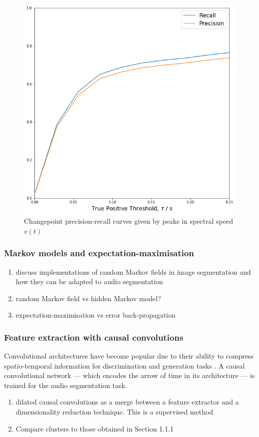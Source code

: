 \documentclass{article}[12pt]
\numberwithin{equation}{section}
\begin{document}
\begin{figure}[H]
\centering{}
\captionsetup{justification=centering}
\includegraphics[scale=0.42]{pr}
\caption{
Changepoint precision-recall curves given by peaks in spectral speed $v(t)$
}
\label{fig:pr}
\end{figure}

\subsubsection{Markov models and expectation-maximisation}
\begin{enumerate}
	\item discuss implementations of random Markov fields in image segmentation
	and how they can be adapted to audio segmentation
	\item random Markov field vs hidden Markov model?
	\item expectation-maximisation vs error back-propagation
\end{enumerate}
\subsubsection{Feature extraction with causal convolutions}
Convolutional architectures have become popular due to their ability to compress spatio-temporal
information for discrimination and generation tasks \cite{Oord2016a,Goodfellow}.
A causal convolutional network \cite{Oord2016} --- which encodes the arrow of time in
its architecture --- is trained for the audio segmentation task.
\begin{enumerate}
	\item dilated causal convolutions as a merge between a feature
	extractor and a dimensionality reduction technique. This is a supervised method
	\item Compare clusters to those obtained in Section 1.1.1
\end{enumerate}
\end{document}
